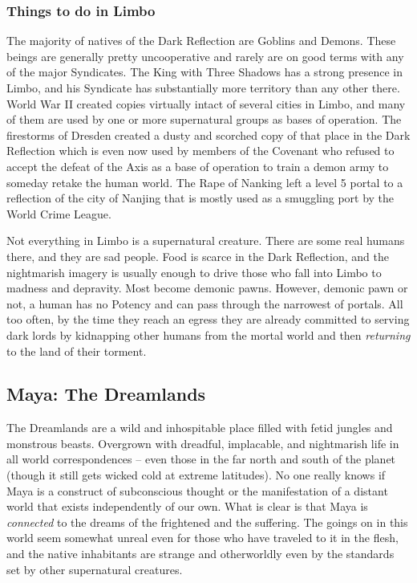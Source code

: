 \subsubsection{Things to do in Limbo}

The majority of natives of the Dark Reflection are Goblins and Demons. These beings are generally pretty uncooperative and rarely are on good terms with any of the major Syndicates. The King with Three Shadows has a strong presence in Limbo, and his Syndicate has substantially more territory than any other there. World War II created copies virtually intact of several cities in Limbo, and many of them are used by one or more supernatural groups as bases of operation. The firestorms of Dresden created a dusty and scorched copy of that place in the Dark Reflection which is even now used by members of the Covenant who refused to accept the defeat of the Axis as a base of operation to train a demon army to someday retake the human world. The Rape of Nanking left a level 5 portal to a reflection of the city of Nanjing that is mostly used as a smuggling port by the World Crime League.

Not everything in Limbo is a supernatural creature. There are some real humans there, and they are sad people. Food is scarce in the Dark Reflection, and the nightmarish imagery is usually enough to drive those who fall into Limbo to madness and depravity. Most become demonic pawns. However, demonic pawn or not, a human has no Potency and can pass through the narrowest of portals. All too often, by the time they reach an egress they are already committed to serving dark lords by kidnapping other humans from the mortal world and then \textit{returning} to the land of their torment.

\subsection{Maya: The Dreamlands} 

The Dreamlands are a wild and inhospitable place filled with fetid jungles and monstrous beasts. Overgrown with dreadful, implacable, and nightmarish life in all world correspondences -- even those in the far north and south of the planet (though it still gets wicked cold at extreme latitudes). No one really knows if Maya is a construct of subconscious thought or the manifestation of a distant world that exists independently of our own. What is clear is that Maya is \textit{connected} to the dreams of the frightened and the suffering. The goings on in this world seem somewhat unreal even for those who have traveled to it in the flesh, and the native inhabitants are strange and otherworldly even by the standards set by other supernatural creatures.

